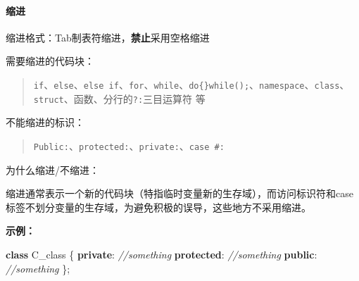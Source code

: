 \documentclass[
]{article}
\newenvironment{Shaded}{}{}
\newcommand{\CommentTok}[1]{\textcolor[rgb]{0.38,0.63,0.69}{\textit{#1}}}
\newcommand{\KeywordTok}[1]{\textcolor[rgb]{0.00,0.44,0.13}{\textbf{#1}}}
\newcommand{\NormalTok}[1]{#1}
\newcommand{\OperatorTok}[1]{\textcolor[rgb]{0.40,0.40,0.40}{#1}}
\begin{document}
\hypertarget{ux7f29ux8fdb}{%
\paragraph{缩进}\label{ux7f29ux8fdb}}

缩进格式：Tab制表符缩进，\textbf{禁止}采用空格缩进

需要缩进的代码块：

\begin{quote}
\texttt{if}、\texttt{else}、\texttt{else\ if}、\texttt{for}、\texttt{while}、\texttt{do\{\}while();}、\texttt{namespace}、\texttt{class}、\texttt{struct}、函数、分行的\texttt{?:}三目运算符
等
\end{quote}

不能缩进的标识：

\begin{quote}
\texttt{Public:}、\texttt{protected:}、\texttt{private:}、\texttt{case\ \#:}
\end{quote}

为什么缩进/不缩进：

缩进通常表示一个新的代码块（特指临时变量新的生存域），而访问标识符和case标签不划分变量的生存域，为避免积极的误导，这些地方不采用缩进。

\textbf{示例：}

\begin{Shaded}
\begin{Highlighting}[]
\KeywordTok{class}\NormalTok{ C\_class }\OperatorTok{\{}
\KeywordTok{private}\OperatorTok{:}
	\CommentTok{//something}
\KeywordTok{protected}\OperatorTok{:}
	\CommentTok{//something}
\KeywordTok{public}\OperatorTok{:}
	\CommentTok{//something}
\OperatorTok{\};}
\end{Highlighting}
\end{Shaded}
\end{document}
